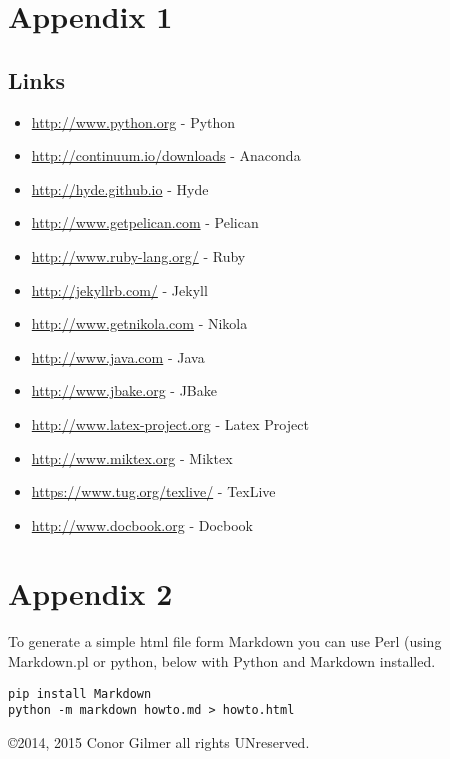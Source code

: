 \documentclass[12pt]{article}			%
\begin{document}
\newpage
\appendix
\section{Appendix 1}
\subsection{Links}

\begin{itemize}
\item\url{http://www.python.org} - Python
\item\url{http://continuum.io/downloads} - Anaconda
\item\url{http://hyde.github.io} - Hyde
\item\url{http://www.getpelican.com} - Pelican
\item\url{http://www.ruby-lang.org/} - Ruby
\item\url{http://jekyllrb.com/} - Jekyll
\item\url{http://www.getnikola.com} - Nikola
\item\url{http://www.java.com} - Java
\item\url{http://www.jbake.org} - JBake
\item\url{http://www.latex-project.org} - Latex Project
\item\url{http://www.miktex.org} - Miktex
\item\url{https://www.tug.org/texlive/} - TexLive
\item\url{http://www.docbook.org} - Docbook
\end{itemize}


\section{Appendix 2}
To generate a simple html file form Markdown you can use Perl (using Markdown.pl or python, below with Python and Markdown installed.
\begin{verbatim}
pip install Markdown
python -m markdown howto.md > howto.html
\end{verbatim}

\copyright 2014, 2015 Conor Gilmer  all rights UNreserved.
\end{document}
